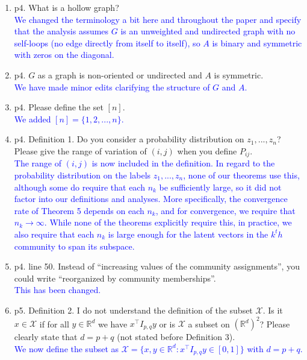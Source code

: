\documentclass[
]{article}
\begin{document}
\begin{enumerate}
\def\labelenumi{\arabic{enumi}.}
\item
  p4. What is a hollow graph?\\
  \textcolor{blue}{
  We changed the terminology a bit here and throughout the paper 
  and specify that the analysis assumes $G$ is an unweighted and undirected graph with no self-loops (no edge directly from itself to itself), 
  so $A$ is binary and symmetric with zeros on the diagonal. 
  }
\item
  p4. \(G\) as a graph is non-oriented or undirected and \(A\) is
  symmetric.\\
  \textcolor{blue}{
  We have made minor edits clarifying the structure of $G$ and $A$. 
  }
\item
  p4. Please define the set \([n]\).\\
  \textcolor{blue}{
  We added $[n] = \{1, 2, ..., n\}$. 
  }
\item
  p4. Definition 1. Do you consider a probability distribution on
  \(z_1, ..., z_n\)? Please give the range of variation of \((i, j)\)
  when you define \(P_{ij}\).\\
  \textcolor{blue}{
  The range of $(i, j)$ is now included in the definition. 
  In regard to the probability distribution on the labels $z_1, ..., z_n$, none of our theorems use this, although some do require that each $n_k$ be sufficiently large, so it did not factor into our definitions and analyses. 
  More specifically, the convergence rate of Theorem 5 depends on each $n_k$, and for convergence, we require that $n_k \to \infty$. 
  While none of the theorems explicitly require this, in practice, we also require that each $n_k$ is large enough for the latent vectors in the $k^th$ community to span its subspace. 
  }
\item
  p4. line 50. Instead of ``increasing values of the community
  assignments'', you could write ``reorganized by community
  memberships''.\\
  \textcolor{blue}{
  This has been changed.
  }
\item
  p5. Definition 2. I do not understand the definition of the subset
  \(\mathcal{X}\). Is it \(x \in \mathcal{X}\) if for all
  \(y \in \mathbb{R}^d\) we have \(x^\top I_{p,q} y\) or is
  \(\mathcal{X}\) a subset on \((\mathbb{R}^d)^2\)? Please clearly state
  that \(d = p + q\) (not stated before Definition 3).\\
  \textcolor{blue}{
  We now define the subset as $\mathcal{X} = \{x, y \in \mathbb{R}^d : x^\top I_{p, q} y \in [0, 1]\}$ with $d = p + q$. 
}
\end{enumerate}
\end{document}
